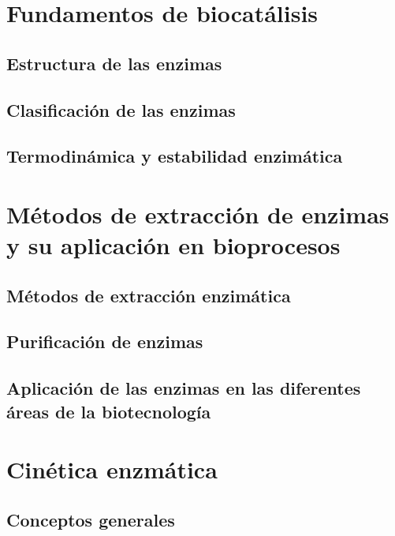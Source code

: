 \documentclass{../summarie}
\begin{document}
\frontmatter

    \NuevaPortada
    \tableofcontents
    \listoffigures
    \listoftables

\mainmatter
    
    \onehalfspacing


\part{Fundamentos de biocatálisis}

    \chapter{Estructura de las enzimas} 
    \chapter{Clasificación de las enzimas} 
    \chapter{Termodinámica y estabilidad enzimática} 
    
\part{Métodos de extracción de enzimas y su aplicación en bioprocesos}

    \chapter{Métodos de extracción enzimática} 
    \chapter{Purificación de enzimas} 
    \chapter{Aplicación de las enzimas en las diferentes áreas de la biotecnología}

\part{Cinética enzmática}

    \chapter{Conceptos generales}     
\end{document}
